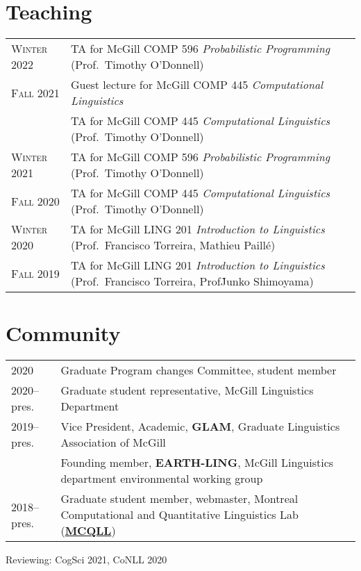 \documentclass[11pt,a4paper]{article}
\begin{document}
  \section{Teaching}
  \begin{longtable}{p{1.7cm}|p{15cm}}
    \textsc{Winter 2022}&%
      TA for McGill COMP 596 \emph{Probabilistic Programming}
      (Prof.\ Timothy O'Donnell)\\
    \textsc{Fall 2021}&%
      Guest lecture for McGill COMP 445 \emph{Computational Linguistics}\\
      &
      TA for McGill COMP 445 \emph{Computational Linguistics}
      (Prof.\ Timothy O'Donnell)\\
    \textsc{Winter 2021}&%
      TA for McGill COMP 596 \emph{Probabilistic Programming}
      (Prof.\ Timothy O'Donnell)\\
    \textsc{Fall 2020}&%
      TA for McGill COMP 445 \emph{Computational Linguistics}
      (Prof.\ Timothy O'Donnell)\\
    \textsc{Winter 2020}&%
      TA for McGill LING 201 \emph{Introduction to Linguistics}
      (Prof.\ Francisco Torreira, Mathieu Paillé)\\
    \textsc{Fall 2019}&%
      TA for McGill LING 201 \emph{Introduction to Linguistics}
      (Prof.\ Francisco Torreira, Prof\. Junko Shimoyama)\\
  \end{longtable}

  \section{Community}
  \begin{longtable}{p{1.7cm}|p{15cm}}
    2020
    &%
      Graduate Program changes Committee, student member\\
    \textsc{2020--}pres.
    &%
      Graduate student representative, McGill Linguistics Department\\
      \textsc{2019--}pres.
    &%
      Vice President, Academic, \textbf{GLAM}, Graduate Linguistics Association
      of McGill\\
    &%
      Founding member, \textbf{EARTH-LING}, McGill Linguistics department
      environmental working group\\
    \textsc{2018--}pres.
    &%
      Graduate student member, webmaster, Montreal Computational and
      Quantitative Linguistics Lab (\href{http://mcqll.org}{\textbf{MCQLL}})\\
  \end{longtable}
  Reviewing: CogSci 2021, CoNLL 2020
\end{document}
